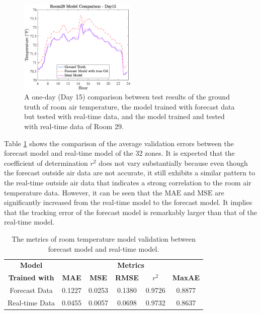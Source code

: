 \documentclass[conference]{IEEEtran}
\begin{document}
\begin{figure}[htbp]
\centerline{\includegraphics[width=0.5\textwidth]{Figures/three_models.eps}}
\caption{A one-day (Day 15) comparison between test results of the ground truth of room air temperature, the model trained with forecast data but tested with real-time data, and the model trained and tested with real-time data of Room 29.}
\label{figModel}
\end{figure}

Table \ref{tabModelDis} shows the comparison of the average validation errors between the forecast model and real-time model of the 32 zones. It is expected that the coefficient of determination $r^2$ does not vary substantially because even though the forecast outside air data are not accurate, it still exhibits a similar pattern to the real-time outside air data that indicates a strong correlation to the room air temperature data. However, it can be seen that the $\mathrm{MAE}$ and $\mathrm{MSE}$ are significantly increased from the real-time model to the forecast model. It implies that the tracking error of the forecast model is remarkably larger than that of the real-time model.

\begin{table}[htbp]
\caption{The metrics of room temperature model validation between forecast model and real-time model.}
\begin{center}
\begin{tabular}{|c|c|c|c|c|c|}
\hline
\textbf{Model} &\multicolumn{5}{|c|}{\textbf{Metrics}} \\
\cline{2-6} 
\textbf{Trained with}&\textbf{MAE} & \textbf{MSE} & \textbf{RMSE} & $r^2$ & \textbf{MaxAE} \\
\hline
Forecast Data & 0.1227  &  0.0253  &  0.1380 &   0.9726  &  0.8877
\\
Real-time Data & 0.0455  &  0.0057 &  0.0698 &  0.9732 &  0.8637 \\
\hline
\end{tabular}
\label{tabModelDis}
\end{center}
\end{table}
\end{document}
